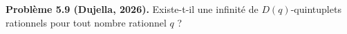 \textbf{Problème 5.9 (Dujella, 2026).} Existe-t-il une infinité de $D(q)$-quintuplets rationnels pour tout nombre rationnel $q$ ?
